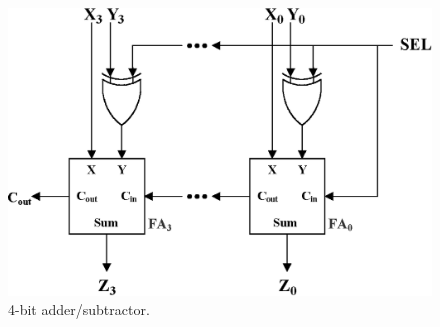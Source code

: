 \documentclass{article}
\begin{document}
\begin{figure}[hbtp]
  \centering
  \includegraphics[width=\textwidth]{adder}
  \caption{\label{fig:adder} 4-bit adder/subtractor.}
\end{figure}



\end{document}
